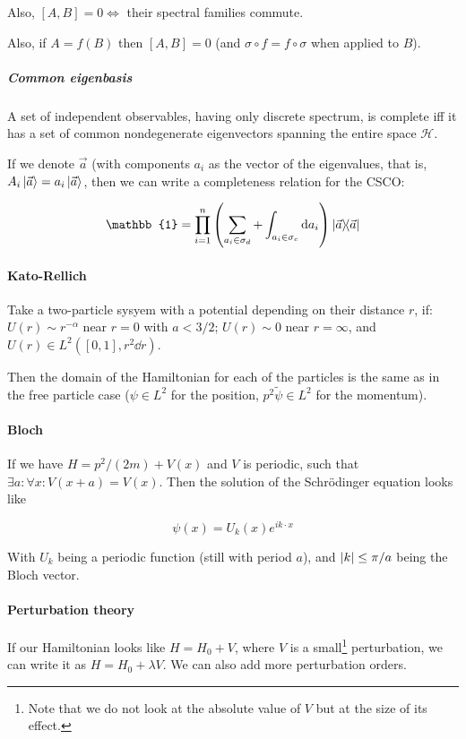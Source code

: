 \documentclass[main.tex]{subfiles}
\begin{document}
Also, $[A, B]=0 \iff$ their spectral families commute.

Also, if $A = f(B)$ then $[A, B] = 0$ (and $\sigma \circ f = f \circ \sigma$ when applied to $B$).

\subparagraph{Common eigenbasis} A set of independent observables, having only discrete spectrum, is complete iff it has a set of common nondegenerate eigenvectors spanning the entire space $\mathcal{H}$.

If we denote $\vec{a}$ (with components $a_i$ as the vector of the eigenvalues, that is, $A_i \ket{\vec{a}} = a_i \ket{\vec{a}}$, then we can write a completeness relation for the CSCO:

\begin{equation}
    \mathbb{1} = \prod_{i=1}^n \qty(
    \sum_{a_i \in \sigma_d} + \int _{a_i \in \sigma_c} \dd{a_i}
    ) \dyad{\vec{a}}
\end{equation}

\paragraph{Kato-Rellich} Take a two-particle sysyem with a potential depending on their distance $r$, if: $U(r) \sim r^{-\alpha}$ near $r=0$ with $a<3/2$; $U(r) \sim 0$ near $r = \infty$, and $U(r) \in L^2 ([0,1], r^2 \dd{r})$.

Then the domain of the Hamiltonian for each of the particles is the same as in the free particle case ($\psi \in L^2$ for the position, $p^2\tilde{\psi} \in L^2$ for the momentum).

\paragraph{Bloch} If we have $H = p^2/(2m) + V(x)$ and $V$ is periodic, such that $\exists a : \forall x: V(x+a)=V(x)$. Then the solution of the Schrödinger equation looks like

\begin{equation}
    \psi(x) = U_k(x) e^{ik\cdot x}
\end{equation}

With $U_k$ being a periodic function (still with period $a$), and $\abs{k} \leq \pi/a$ being the Bloch vector.

\paragraph{Perturbation theory} If our Hamiltonian looks like $H=H_0 + V$, where $V$ is a small\footnote{Note that we do not look at the absolute value of $V$ but at the size of its effect.} perturbation, we can write it as $H = H_0 + \lambda V$. We can also add more perturbation orders.
\end{document}
